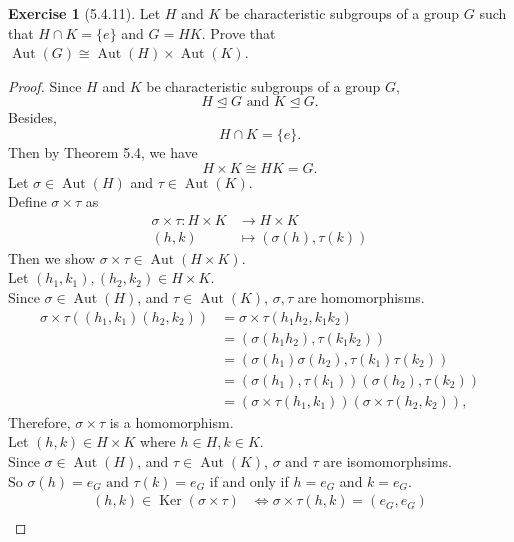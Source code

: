 \documentclass{amsart}
\renewcommand{\ker}{\operatorname{Ker}}
\theoremstyle{plain}
\theoremstyle{definition}
\newtheorem{exer}[lem]{Exercise}
\begin{document}
\begin{exer}[5.4.11]
Let $H$ and $K$ be characteristic subgroups of a group $G$ such that $H\cap K=\{e\}$
and $G=HK$. Prove that $\operatorname{Aut}(G)\cong\operatorname{Aut}(H)\times\operatorname{Aut}(K)$.

\begin{proof}
	Since $H$ and $K$ be characteristic subgroups of a group $G$,\\
	\[H \unlhd G \text{ and } K \unlhd G.\]
	Besides, 
	\[H \cap K = \{e\}.\]
	Then by Theorem 5.4, we have
	\[H \times K \cong HK = G. \]
	Let $\sigma \in \operatorname{Aut}(H)$ and $\tau \in \operatorname{Aut}(K)$.\\
	Define $\sigma \times \tau $ as
	\begin{align*}
	  \sigma \times \tau: H\times K &\to H\times K \\ 
	  (h,k) &\mapsto (\sigma(h), \tau (k))  
	\end{align*}
	Then we show $\sigma \times \tau \in \operatorname{Aut}(H \times K)$.\\
	Let $(h_1,k_1),(h_2,k_2) \in H\times K$.\\
	Since $\sigma \in \operatorname{Aut}(H)$, and $\tau \in \operatorname{Aut}(K)$, $\sigma,\tau$ are homomorphisms.
	\begin{align*}
	  \sigma \times \tau \left((h_1,k_1)(h_2,k_2)\right) &= \sigma \times \tau(h_1h_2,k_1k_2) \\
	  													 &=\left(\sigma(h_1h_2),\tau(k_1k_2)\right) \\
	  													 &=\left(\sigma(h_1)\sigma(h_2),\tau(k_1)\tau(k_2)\right) \\
	  													 &=\left(\sigma(h_1),\tau(k_1)\right) \left(\sigma(h_2),\tau(k_2)\right)\\
	  													 &=\left(\sigma \times \tau(h_1,k_1)\right)\left(\sigma \times \tau(h_2,k_2)\right),
	\end{align*}
	Therefore, $\sigma \times \tau$ is a homomorphism.\\
	Let $(h,k) \in H \times K$ where $h \in H, k \in K$.\\
	Since $\sigma \in \operatorname{Aut}(H)$, and $\tau \in \operatorname{Aut}(K)$, $\sigma$ and $\tau$ are isomomorphsims. \\
	So $\sigma (h) = e_G \text{ and }\tau (k) = e_G$ if and only if $h = e_G$ and $k = e_G$.
	\begin{align*}
	  (h,k) \in \ker(\sigma \times \tau) & \Leftrightarrow \sigma \times \tau (h,k) =(e_G,e_G) \\

\end{align*}
\end{proof}
\end{exer}
\end{document}
